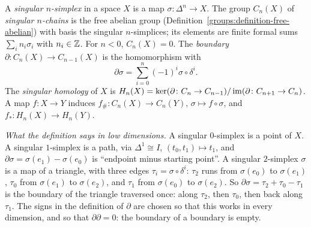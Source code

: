 \begin{definition}\label{singular-homology:definition-singular-homology}
A \emph{singular $n$-simplex} in a space $X$ is a map $\sigma \colon \Delta^n \to X$. The group $C_n(X)$ of \emph{singular $n$-chains} is the free abelian group
(Definition~\ref{groups:definition-free-abelian}) with basis the singular $n$-simplices; its elements are finite formal sums $\sum_i n_i\sigma_i$ with
$n_i \in \mathbb{Z}$. For $n < 0$, $C_n(X) = 0$. The \emph{boundary} $\partial \colon C_n(X) \to C_{n-1}(X)$ is the homomorphism with
\[
\partial\sigma = \sum_{i=0}^n (-1)^i \sigma \circ \delta^i.
\]
The \emph{singular homology} of $X$ is $H_n(X) = \ker(\partial \colon C_n \to C_{n-1})/\operatorname{im}(\partial \colon C_{n+1} \to C_n)$. A map $f \colon X \to Y$ induces
$f_\# \colon C_n(X) \to C_n(Y)$, $\sigma \mapsto f \circ \sigma$, and $f_* \colon H_n(X) \to H_n(Y)$.
\end{definition}

\emph{What the definition says in low dimensions.} A singular $0$-simplex is a point of $X$. A singular $1$-simplex is a path, via $\Delta^1 \cong I$, $(t_0, t_1) \mapsto t_1$,
and $\partial\sigma = \sigma(e_1) - \sigma(e_0)$ is ``endpoint minus starting point''. A singular $2$-simplex $\sigma$ is a map of a triangle, with three edges
$\tau_i = \sigma \circ \delta^i$: $\tau_2$ runs from $\sigma(e_0)$ to $\sigma(e_1)$, $\tau_0$ from $\sigma(e_1)$ to $\sigma(e_2)$, and $\tau_1$ from $\sigma(e_0)$ to $\sigma(e_2)$.
So $\partial\sigma = \tau_2 + \tau_0 - \tau_1$ is the boundary of the triangle traversed once: along $\tau_2$, then $\tau_0$, then back along $\tau_1$. The signs in the
definition of $\partial$ are chosen so that this works in every dimension, and so that $\partial\partial = 0$: the boundary of a boundary is empty.

